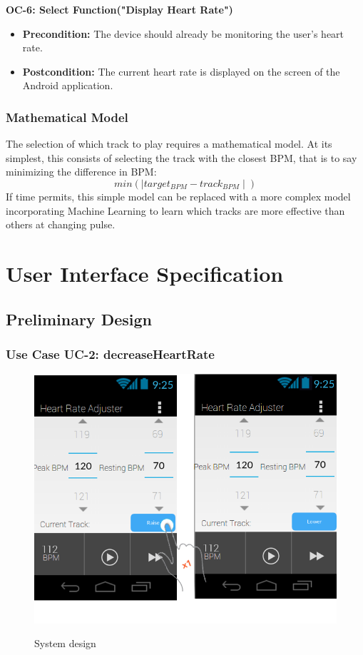 \documentclass[letterpaper,english, 12pt]{scrreprt}
\begin{document}
{\bf OC-6: Select Function("Display Heart Rate")}
\begin{itemize}
	\item {\bf Precondition: } The device should already be monitoring the user's heart rate.
	\item {\bf Postcondition: } The current heart rate is displayed on the screen of the Android application.
\end{itemize}

\subsection{Mathematical Model}
The selection of which track to play requires a mathematical model. At its simplest, this consists of selecting the track with the closest BPM, that is to say minimizing the difference in BPM:
\begin{equation}
  min(\mid target_{BPM} - track_{BPM} \mid)
\end{equation}
If time permits, this simple model can be replaced with a more complex model incorporating Machine Learning to learn which tracks are more effective than others at changing pulse.

\chapter{User Interface Specification}
\section{Preliminary Design}

\subsection{Use Case UC-2: decreaseHeartRate}

\begin{figure}[H]
	\centering
	\includegraphics{img/Prelim_Design/PrelimDesign_1.png}\\
	\caption{System design}
\end{figure}
\end{document}

